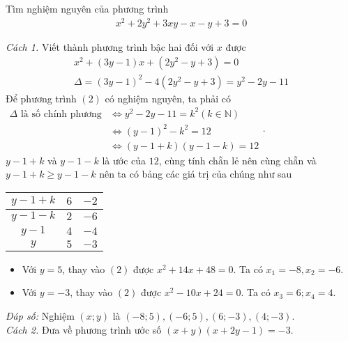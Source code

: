 \begin{vd}
    Tìm nghiệm nguyên của phương trình 
    \begin{align}
    x^2+2y^2+3xy-x-y+3=0\tag {1}
    \end{align}
    \loigiai
    {
    \textit{Cách 1.} Viết thành phương trình bậc hai đối với $x$ được
\begin{align}
x^2+(3y-1)x+\left(2y^2-y+3\right)=0\tag {2}\\
\Delta = (3y-1)^2-4(2y^2-y+3)=y^2-2y-11\nonumber
\end{align}
    Để phương trình $(2)$ có nghiệm nguyên, ta phải có\\
    $\begin{aligned}
    \Delta \text{ là số chính phương}
    &\Leftrightarrow y^2-2y-11=k^2\left(k\in\mathbb{N}\right)\\
    &\Leftrightarrow \left(y-1\right)^2-k^2=12\\
    &\Leftrightarrow \left(y-1+k\right)\left(y-1-k\right)=12
    \end{aligned}$.\\
    $y-1+k$ và $y-1-k$ là ước của $12$, cùng tính chẵn lẻ nên cùng chẵn và $y-1+k\ge y-1-k$ nên ta có bảng các giá trị của chúng như sau
    \begin{center}
    \setlength{\tabcolsep}{18pt}
    \begin{tabular}{| c | c| c | }
                 \hline 
                 $y-1+k$ & $6$   &  $-2$   \\ 
                  \hline 
                 $y-1-k$ & $2$   &  $-6$  \\
                  \hline 
                 $y-1$ & $4$   &  $-4$   \\
                  \hline 
                 $y$ & $5$  &  $-3$ \\
                 \hline 
                 \end{tabular}            
    \end{center}
    \begin{itemize}
    \item Với $y=5$, thay vào $(2)$ được $x^2+14x+48=0$. Ta có $x_1=-8,x_2=-6$.
    \item Với $y=-3$, thay vào $(2)$ được $x^2-10x+24=0$. Ta có $x_3=6;x_4=4$.
    \end{itemize}
    \textit{Đáp số: } Nghiệm $(x;y)$ là $(-8;5),(-6;5),(6;-3),(4;-3)$.\\
    \textit{Cách 2. }Đưa về phương trình ước số $(x+y)(x+2y-1)=-3$.\\
}
\end{vd}
